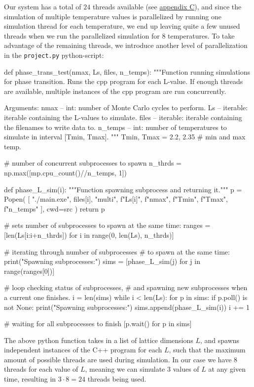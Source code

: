 \documentclass[reprint,english,notitlepage]{revtex4-1}  %
\begin{document}
Our system has a total of \(24\) threads available (see \hyperref[C]{appendix C}), and since the simulation of multiple temperature values is parallelized by running one simulation thread for each temperature, we end up leaving quite a few unused threads when we run the parallelized simulation for \(8\) temperatures. To take advantage of the remaining threads, we introduce another level of parallelization in the \verb+project.py+ python-script:
\begin{python}
def phase_trans_test(nmax, Ls, files, n_temps):
    """Function running simulations for phase transition.
    Runs the cpp program for each L-value. If enough threads are
    available, multiple instances of the cpp program are run
    concurrently.

    Arguments:
    nmax -- int: number of Monte Carlo cycles to perform.
    Ls -- iterable: iterable containing the L-values to simulate.
    files -- iterable: iterable containing the filenames to
    				   write data to.
    n_temps -- int: number of temperatures to simulate in interval
                    [Tmin, Tmax].
    """
    Tmin, Tmax = 2.2, 2.35  # min and max temp.

    # number of concurrent subprocesses to spawn
    n_thrds = np.max([mp.cpu_count()//n_temps, 1])

    def phase_L_sim(i):
        """Function spawning subprocess and returning it."""
        p = Popen(
            [
                "./main.exe",
                files[i],
                "multi",
                f"{Ls[i]}",
                f"{nmax}",
                f"{Tmin}",
                f"{Tmax}",
                f"{n_temps}"
            ],
            cwd=src
        )
        return p

    # sets number of subprocesses to spawn at the same time:
    ranges = [len(Ls[i:i+n_thrds])
    		  for i in range(0, len(Ls), n_thrds)]
    		  
    # iterating through number of subprocesses
    # to spawn at the same time:
    print("Spawning subprocesses:")
    sims = [phase_L_sim(j) for j in range(ranges[0])]

    # loop checking status of subprocesses,
    # and spawning new subprocesses when a current one finishes.
    i = len(sims)
    while i < len(Ls):
        for p in sims:
            if p.poll() is not None:
                print("Spawning subprocesses:")
                sims.append(phase_L_sim(i))
                i += 1

    # waiting for all subprocesses to finish
    [p.wait() for p in sims]
\end{python}
The above python function takes in a list of lattice dimensions \(L\), and spawns independent instances of the C++ program for each \(L\), such that the maximum amount of possible threads are used during simulation. In our case we have \(8\) threads for each value of \(L\), meaning we can simulate \(3\) values of \(L\) at any given time, resulting in \(3\cdot 8 = 24\) threads being used.
\end{document}
